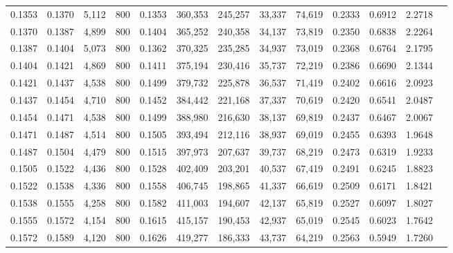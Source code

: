 \begin{tabular}{rrrrrrrrrrrrr}
0.1353 & 0.1370 &  5,112 & 800 &                                     0.1353 & 360,353 & 245,257 &  33,337 &  74,619 & 0.2333 & 0.6912 & 2.2718 \\
0.1370 & 0.1387 &  4,899 & 800 &                                     0.1404 & 365,252 & 240,358 &  34,137 &  73,819 & 0.2350 & 0.6838 & 2.2264 \\
0.1387 & 0.1404 &  5,073 & 800 &                                     0.1362 & 370,325 & 235,285 &  34,937 &  73,019 & 0.2368 & 0.6764 & 2.1795 \\
0.1404 & 0.1421 &  4,869 & 800 &                                     0.1411 & 375,194 & 230,416 &  35,737 &  72,219 & 0.2386 & 0.6690 & 2.1344 \\
0.1421 & 0.1437 &  4,538 & 800 &                                     0.1499 & 379,732 & 225,878 &  36,537 &  71,419 & 0.2402 & 0.6616 & 2.0923 \\
0.1437 & 0.1454 &  4,710 & 800 &                                     0.1452 & 384,442 & 221,168 &  37,337 &  70,619 & 0.2420 & 0.6541 & 2.0487 \\
0.1454 & 0.1471 &  4,538 & 800 &                                     0.1499 & 388,980 & 216,630 &  38,137 &  69,819 & 0.2437 & 0.6467 & 2.0067 \\
0.1471 & 0.1487 &  4,514 & 800 &                                     0.1505 & 393,494 & 212,116 &  38,937 &  69,019 & 0.2455 & 0.6393 & 1.9648 \\
0.1487 & 0.1504 &  4,479 & 800 &                                     0.1515 & 397,973 & 207,637 &  39,737 &  68,219 & 0.2473 & 0.6319 & 1.9233 \\
0.1505 & 0.1522 &  4,436 & 800 &                                     0.1528 & 402,409 & 203,201 &  40,537 &  67,419 & 0.2491 & 0.6245 & 1.8823 \\
0.1522 & 0.1538 &  4,336 & 800 &                                     0.1558 & 406,745 & 198,865 &  41,337 &  66,619 & 0.2509 & 0.6171 & 1.8421 \\
0.1538 & 0.1555 &  4,258 & 800 &                                     0.1582 & 411,003 & 194,607 &  42,137 &  65,819 & 0.2527 & 0.6097 & 1.8027 \\
0.1555 & 0.1572 &  4,154 & 800 &                                     0.1615 & 415,157 & 190,453 &  42,937 &  65,019 & 0.2545 & 0.6023 & 1.7642 \\
0.1572 & 0.1589 &  4,120 & 800 &                                     0.1626 & 419,277 & 186,333 &  43,737 &  64,219 & 0.2563 & 0.5949 & 1.7260 \\

\end{tabular}

